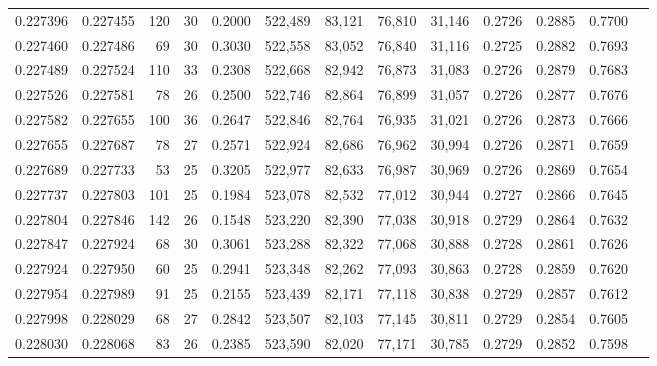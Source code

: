 \begin{tabular}{rrrrrrrrrrrrr}
0.227396 & 0.227455 & 120 &  30 &                                     0.2000 & 522,489 &  83,121 &  76,810 &  31,146 & 0.2726 & 0.2885 & 0.7700 \\
0.227460 & 0.227486 &  69 &  30 &                                     0.3030 & 522,558 &  83,052 &  76,840 &  31,116 & 0.2725 & 0.2882 & 0.7693 \\
0.227489 & 0.227524 & 110 &  33 &                                     0.2308 & 522,668 &  82,942 &  76,873 &  31,083 & 0.2726 & 0.2879 & 0.7683 \\
0.227526 & 0.227581 &  78 &  26 &                                     0.2500 & 522,746 &  82,864 &  76,899 &  31,057 & 0.2726 & 0.2877 & 0.7676 \\
0.227582 & 0.227655 & 100 &  36 &                                     0.2647 & 522,846 &  82,764 &  76,935 &  31,021 & 0.2726 & 0.2873 & 0.7666 \\
0.227655 & 0.227687 &  78 &  27 &                                     0.2571 & 522,924 &  82,686 &  76,962 &  30,994 & 0.2726 & 0.2871 & 0.7659 \\
0.227689 & 0.227733 &  53 &  25 &                                     0.3205 & 522,977 &  82,633 &  76,987 &  30,969 & 0.2726 & 0.2869 & 0.7654 \\
0.227737 & 0.227803 & 101 &  25 &                                     0.1984 & 523,078 &  82,532 &  77,012 &  30,944 & 0.2727 & 0.2866 & 0.7645 \\
0.227804 & 0.227846 & 142 &  26 &                                     0.1548 & 523,220 &  82,390 &  77,038 &  30,918 & 0.2729 & 0.2864 & 0.7632 \\
0.227847 & 0.227924 &  68 &  30 &                                     0.3061 & 523,288 &  82,322 &  77,068 &  30,888 & 0.2728 & 0.2861 & 0.7626 \\
0.227924 & 0.227950 &  60 &  25 &                                     0.2941 & 523,348 &  82,262 &  77,093 &  30,863 & 0.2728 & 0.2859 & 0.7620 \\
0.227954 & 0.227989 &  91 &  25 &                                     0.2155 & 523,439 &  82,171 &  77,118 &  30,838 & 0.2729 & 0.2857 & 0.7612 \\
0.227998 & 0.228029 &  68 &  27 &                                     0.2842 & 523,507 &  82,103 &  77,145 &  30,811 & 0.2729 & 0.2854 & 0.7605 \\
0.228030 & 0.228068 &  83 &  26 &                                     0.2385 & 523,590 &  82,020 &  77,171 &  30,785 & 0.2729 & 0.2852 & 0.7598 \\

\end{tabular}
